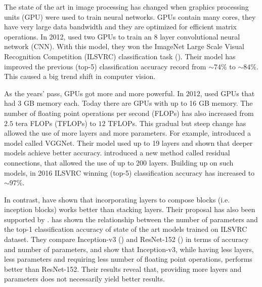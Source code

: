 
The state of the art in image processing has changed when graphics processing units (GPU) were used to train neural networks. GPUs contain many cores, they have very large data bandwidth and they are optimized for efficient matrix operations. In 2012, \cite{krizhevsky2012imagenet} used two GPUs to train an 8 layer convolutional neural network (CNN). With this model, they won the ImageNet Large Scale Visual Recognition Competition (ILSVRC) classification task (\cite{deng2012image}). Their model has improved the previous (top-5) classification accuracy record from $\sim 74\%$ to $\sim 84\%$. This caused a big trend shift in computer vision. 

As the years' pass, GPUs got more and more powerful. In 2012, \cite{krizhevsky2012imagenet} used GPUs that had 3 GB memory each. Today there are GPUs with up to 16 GB memory. The number of floating point operations per second (FLOPs) has also increased from $2.5$ tera FLOPs (TFLOPs) to $12$ TFLOPs. This gradual but steep change has allowed the use of more layers and more parameters. For example, \cite{Simonyan:2014aa} introduced a model called VGGNet. Their model used up to 19 layers and shown that deeper models achieve better accuracy. \cite{He:2015aa} introduced a new method called residual connections, that allowed the use of up to 200 layers. Building up on such models, in 2016 ILSVRC winning (top-5) classification accuracy has increased to $\sim 97\%$. 

In contrast, \cite{Szegedy:2014aa} have shown that incorporating layers to compose blocks (i.e. inception blocks) works better than stacking layers. Their proposal has also been supported by \cite{Canziani:2016aa}. \cite{Canziani:2016aa} has shown the relationship between the number of parameters and the top-1 classification accuracy of state of the art models trained on ILSVRC dataset. They compare Inception-v3 (\cite{Szegedy_2016_CVPR}) and ResNet-152 (\cite{He:2015aa}) in terms of accuracy and number of parameters, and show that Inception-v3, while having less layers, less parameters and requiring less number of floating point operations, performs better than ResNet-152. Their results reveal that, providing more layers and parameters does not necessarily yield better results. 

